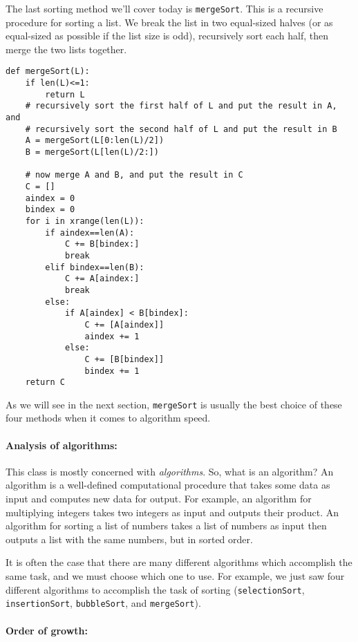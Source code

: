 \documentclass[11pt]{article}
\begin{document}
The last sorting method we'll cover today is \texttt{mergeSort}.  This
is a recursive procedure for sorting a list.  We break the list in two
equal-sized halves (or as equal-sized as possible if the list size is
odd), recursively sort each half, then merge the two lists together.

\begin{verbatim}
def mergeSort(L):
    if len(L)<=1:
        return L
    # recursively sort the first half of L and put the result in A, and
    # recursively sort the second half of L and put the result in B
    A = mergeSort(L[0:len(L)/2])
    B = mergeSort(L[len(L)/2:])

    # now merge A and B, and put the result in C
    C = []
    aindex = 0
    bindex = 0
    for i in xrange(len(L)):
        if aindex==len(A):
            C += B[bindex:]
            break
        elif bindex==len(B):
            C += A[aindex:]
            break
        else:
            if A[aindex] < B[bindex]:
                C += [A[aindex]]
                aindex += 1
            else:
                C += [B[bindex]]
                bindex += 1
    return C
\end{verbatim}

As we will see in the next section, \texttt{mergeSort} is usually the
best choice of these four methods when it comes to algorithm speed.

\paragraph{\Large Analysis of algorithms:}

This class is mostly concerned with {\em algorithms}.
So, what is an algorithm?  An algorithm is a well-defined
computational procedure
that takes some data as input and computes new data for
output. 
For example, an algorithm for multiplying integers takes two
integers as input and outputs their product.
An algorithm for sorting a list of numbers takes
a list of numbers as input then outputs a list with the same numbers,
but in sorted order.

It is often the case that there are many
different algorithms which accomplish the same task, and we must
choose which one to use.
For example, we just saw four different algorithms to
accomplish the task of sorting (\texttt{selectionSort},
\texttt{insertionSort}, \texttt{bubbleSort}, and
\texttt{mergeSort}). 

\paragraph{Order of growth:}
\end{document}
